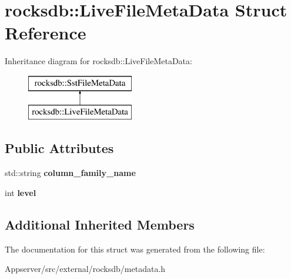 \hypertarget{structrocksdb_1_1LiveFileMetaData}{}\section{rocksdb\+:\+:Live\+File\+Meta\+Data Struct Reference}
\label{structrocksdb_1_1LiveFileMetaData}
Inheritance diagram for rocksdb\+:\+:Live\+File\+Meta\+Data\+:\begin{figure}[H]
\begin{center}
\leavevmode
\includegraphics[height=2.000000cm]{structrocksdb_1_1LiveFileMetaData}
\end{center}
\end{figure}
\subsection*{Public Attributes}
\begin{DoxyCompactItemize}
\item 
std\+::string {\bfseries column\+\_\+family\+\_\+name}\hypertarget{structrocksdb_1_1LiveFileMetaData_a23fdc484a64a60650dc81436ddaf679c}{}\label{structrocksdb_1_1LiveFileMetaData_a23fdc484a64a60650dc81436ddaf679c}

\item 
int {\bfseries level}\hypertarget{structrocksdb_1_1LiveFileMetaData_a20f482793b1d9c47e8f141f4efcf5338}{}\label{structrocksdb_1_1LiveFileMetaData_a20f482793b1d9c47e8f141f4efcf5338}

\end{DoxyCompactItemize}
\subsection*{Additional Inherited Members}


The documentation for this struct was generated from the following file\+:\begin{DoxyCompactItemize}
\item 
Appserver/src/external/rocksdb/metadata.\+h\end{DoxyCompactItemize}
